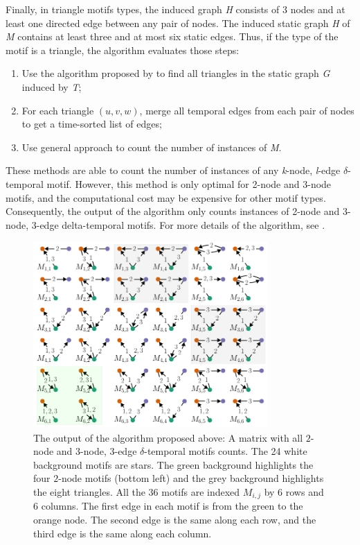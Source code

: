 \documentclass[../../thesis.tex]{subfiles}
\begin{document}
Finally, in triangle motifs types, the induced graph \textit{H} consists of 3 nodes and at least one directed edge between any pair of nodes. The induced static graph \textit{H} of \textit{M} contains at least three and at most six static edges. 
Thus, if the type of the motif is a triangle, the algorithm evaluates those steps:
\begin{enumerate}
  \item{Use the algorithm proposed by \cite{latapy2008main_14} to find all triangles in the static graph \textit{G} induced by \textit{T};}
  \item{For each triangle \textit{$(u, v, w)$}, merge all temporal edges from each pair of nodes to get a time-sorted list of edges;}
  \item{Use general approach to count the number of instances of \textit{M}.}
\end{enumerate}


These methods are able to count the number of instances of any \textit{k}-node, \textit{l}-edge $\delta$-temporal motif. However, this method is only optimal for 2-node and 3-node motifs, and the computational cost may be expensive for other motif types. Consequently, the output of the algorithm only counts instances of 2-node and 3-node, 3-edge delta-temporal motifs. For more details of the algorithm, see \cite{temporalMotifs}.



\begin{figure}[H]
\centering
\includegraphics[width=0.8\textwidth]{content/unveiling/img/embedded-three-edge-all}
\caption{The output of the algorithm proposed above: A matrix with all $2$-node and $3$-node, $3$-edge $\delta$-temporal motifs counts. The 24 white background motifs are stars. The green background highlights the four $2$-node motifs (bottom left) and the grey background highlights the eight triangles. All the 36 motifs are indexed $M_{i,j}$ by 6 rows and 6 columns. The first edge in each motif is from the green to the orange node. The second edge is the same along each row, and the third edge is the same along each column.}
\label{fig:all_three_edge_motifs}
\end{figure}
\end{document}

